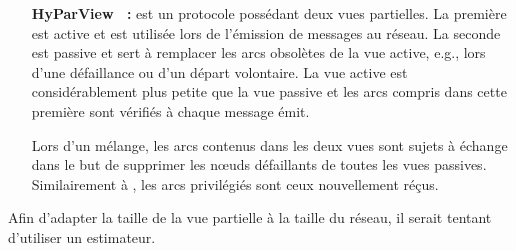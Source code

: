 \begin{itemize}
\item [\textbf{HyParView~\cite{leitao2007dependable} :}] est un protocole
  possédant deux vues partielles. La première est active et est utilisée lors de
  l'émission de messages au réseau. La seconde est passive et sert à remplacer
  les arcs obsolètes de la vue active, e.g., lors d'une défaillance ou d'un
  départ volontaire.  La vue active est considérablement plus petite que la vue
  passive et les arcs compris dans cette première sont vérifiés à chaque message
  émit.

  Lors d'un mélange, les arcs contenus dans les deux vues sont sujets à échange
  dans le but de supprimer les nœuds défaillants de toutes les vues
  passives. Similairement à \CYCLON, les arcs privilégiés sont ceux nouvellement
  réçus. 
\end{itemize}

Afin d'adapter la taille de la vue partielle à la taille du réseau, il serait
tentant d'utiliser un estimateur. 

